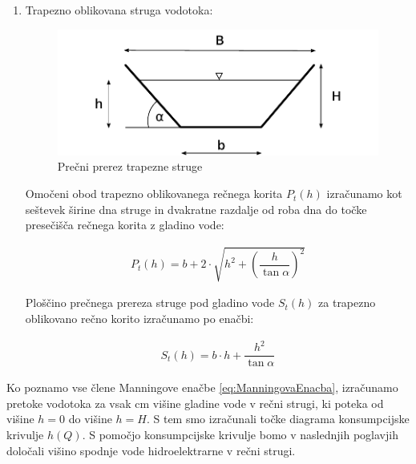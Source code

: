 \begin{enumerate}
	\item Trapezno oblikovana struga vodotoka:
	
		\begin{figure}[ht!]
			\begin{centering}
				\includegraphics{slike/konsumpcijska_krivulja/trapezoidChannel.pdf}		
				\caption{Prečni prerez trapezne struge}\label{fig:trapezna struga}
			\end{centering}
		\end{figure}
	
	Omočeni obod trapezno oblikovanega rečnega korita $P_t(h)$ izračunamo kot seštevek širine dna struge in dvakratne razdalje od roba dna do točke presečišča rečnega korita z gladino vode:
	
	\begin{ceqn}
	\begin{align}
	P_{t}(h) = b + 2 \cdot \sqrt{h^2 + \left(\dfrac{h} {\tan\alpha} \right)^{2}}
	\end{align}
	\end{ceqn}
	
	Ploščino prečnega prereza struge pod gladino vode $S_t(h)$ za trapezno oblikovano rečno korito izračunamo po enačbi:
	\begin{ceqn}
	\begin{align}
	S_{t}(h) = b \cdot h + \dfrac{h^2}{\tan\alpha}
	\end{align}
	\end{ceqn}
	
\end{enumerate}



Ko poznamo vse člene Manningove enačbe \ref{eq:ManningovaEnacba}, izračunamo pretoke vodotoka za vsak cm višine gladine vode v rečni strugi, ki poteka od višine $h=0$ do višine $h=H$. S tem smo izračunali točke diagrama konsumpcijske krivulje $h(Q)$. S pomočjo konsumpcijske krivulje bomo v naslednjih poglavjih določali višino spodnje vode hidroelektrarne v rečni strugi.



